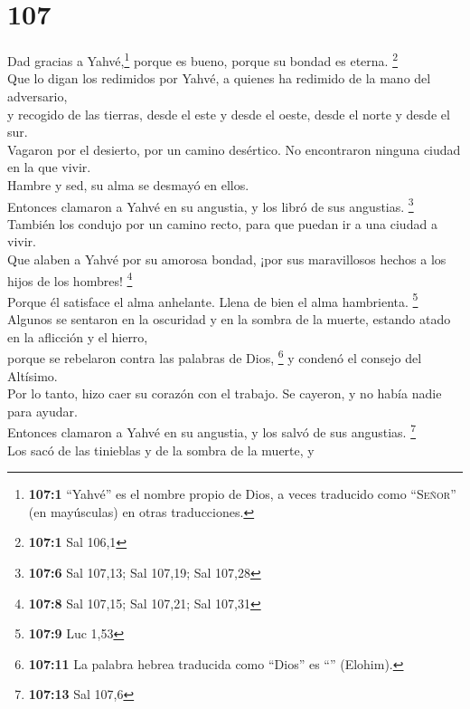 \hypertarget{section-104}{%
\section{107}\label{section-104}}

 Dad gracias a Yahvé,\footnote{\textbf{107:1} ``Yahvé'' es
  el nombre propio de Dios, a veces traducido como ``\textsc{Señor}''
  (en mayúsculas) en otras traducciones.} porque es bueno, porque su
bondad es eterna. \footnote{\textbf{107:1} Sal 106,1}\\
 Que lo digan los redimidos por Yahvé, a quienes ha
redimido de la mano del adversario,\\
 y recogido de las tierras, desde el este y desde el
oeste, desde el norte y desde el sur.\\
 Vagaron por el desierto, por un camino desértico. No
encontraron ninguna ciudad en la que vivir.\\
 Hambre y sed, su alma se desmayó en ellos.\\
 Entonces clamaron a Yahvé en su angustia, y los libró de
sus angustias. \footnote{\textbf{107:6} Sal 107,13; Sal 107,19; Sal
  107,28}\\
 También los condujo por un camino recto, para que puedan
ir a una ciudad a vivir.\\
 Que alaben a Yahvé por su amorosa bondad, ¡por sus
maravillosos hechos a los hijos de los hombres! \footnote{\textbf{107:8}
  Sal 107,15; Sal 107,21; Sal 107,31}\\
 Porque él satisface el alma anhelante. Llena de bien el
alma hambrienta. \footnote{\textbf{107:9} Luc 1,53}\\
 Algunos se sentaron en la oscuridad y en la sombra de la
muerte, estando atado en la aflicción y el hierro,\\
 porque se rebelaron contra las palabras de Dios,
\footnote{\textbf{107:11} La palabra hebrea traducida como ``Dios'' es
  ``'' (Elohim).} y condenó el consejo del Altísimo.\\
 Por lo tanto, hizo caer su corazón con el trabajo. Se
cayeron, y no había nadie para ayudar.\\
 Entonces clamaron a Yahvé en su angustia, y los salvó de
sus angustias. \footnote{\textbf{107:13} Sal 107,6}\\
 Los sacó de las tinieblas y de la sombra de la muerte, y
